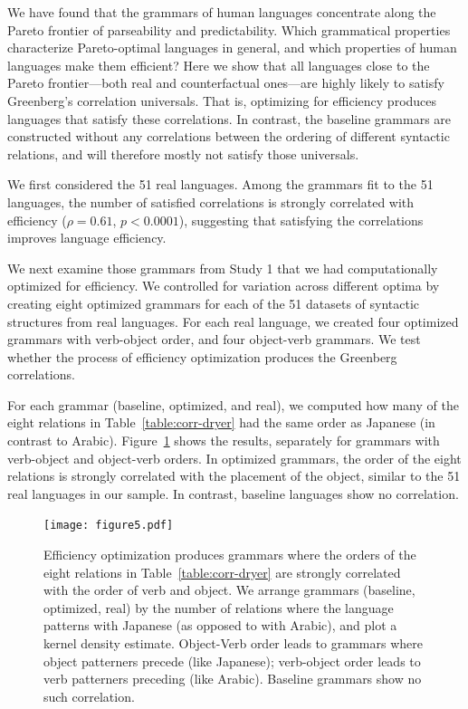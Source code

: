 \documentclass[9pt,twocolumn,twoside,lineno]{pnas-new}
\begin{document}
We have found that the grammars of human languages concentrate along the Pareto frontier of parseability and predictability.
Which grammatical properties characterize Pareto-optimal languages in general, and which properties of human languages make them efficient?
Here we show that all languages close to the Pareto frontier---both real and counterfactual ones---are highly likely to satisfy Greenberg's correlation universals.
That is, optimizing for efficiency produces languages that satisfy these correlations.
In contrast, the baseline grammars are constructed without any correlations between the ordering of different syntactic relations, and will therefore mostly not satisfy those universals.

We first considered the 51 real languages.
Among the grammars fit to the 51 languages, the number of satisfied correlations is strongly correlated with efficiency ($\rho = 0.61$, $p<0.0001$), suggesting that satisfying the correlations improves language efficiency.


We next examine those grammars from Study 1 that we had computationally optimized for efficiency.
We controlled for variation across different optima by creating eight optimized grammars for each of the 51 datasets of syntactic structures from real languages.
For each real language, we created four optimized grammars with verb-object order, and four object-verb grammars.
We test whether the process of efficiency optimization produces the Greenberg correlations.


For each grammar (baseline, optimized, and real), we computed how many of the eight relations in Table~\ref{table:corr-dryer} had the same order as  Japanese (in contrast to Arabic).
Figure~\ref{fig:joint} shows the results, separately for grammars with verb-object and object-verb orders.
In optimized grammars, the order of the eight relations is strongly correlated with the placement of the object, similar to the 51 real languages in our sample.
In contrast, baseline languages show no correlation.


\begin{figure}
	\begin{center}
		\texttt{[image: figure5.pdf]}
	\end{center}
    \caption{
    Efficiency optimization produces grammars where the orders of the eight relations in Table~\ref{table:corr-dryer} are strongly correlated with the order of verb and object. We arrange grammars (baseline, optimized, real) by the number of relations where the language patterns with Japanese (as opposed to with Arabic), and plot a kernel density estimate. Object-Verb order leads to grammars where object patterners precede (like Japanese); verb-object order leads to verb patterners preceding (like Arabic). Baseline grammars show no such correlation.
    }
    \label{fig:joint}
\end{figure}
\end{document}
